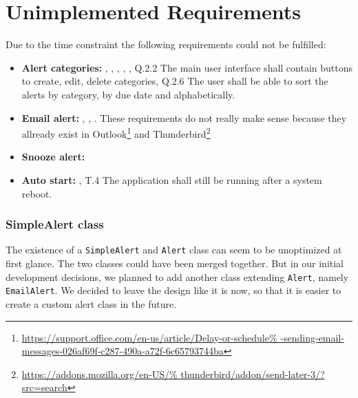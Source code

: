 \section{Unimplemented Requirements}\label{sec:unimplreq}

Due to the time constraint the following requirements could not be fulfilled:

\begin{itemize}

    \item \textbf{Alert categories:}
        ,
        ,
        ,
        ,
        , Q.2.2 The main user interface
        shall contain buttons to create, edit, delete categories, Q.2.6 The user
        shall be able to sort the alerts by category, by due date and
        alphabetically.

    \item \textbf{Email alert:}
        ,
        ,
        . These requirements do not
        really make sense because they allready exist in Outlook\footnote{\url{
                https://support.office.com/en-us/article/Delay-or-schedule%
                -sending-email-messages-026af69f-c287-490a-a72f-6c65793744ba}}
                and Thunderbird\footnote{\url{https://addons.mozilla.org/en-US/%
                thunderbird/addon/send-later-3/?src=search}}

     \item \textbf{Snooze alert:}

     \item \textbf{Auto start:}
         , T.4 The application shall still be
         running after a system reboot.


\end{itemize}

\subsubsection{SimpleAlert class}

The existence of a \texttt{SimpleAlert} and \texttt{Alert} class can seem to be
unoptimized at first glance. The two classes could have been merged together.
But in our initial development decisions, we planned to add another class
extending \texttt{Alert}, namely \texttt{EmailAlert}. We decided to leave the
design like it is now, so that it is easier to create a custom alert class in
the future.
